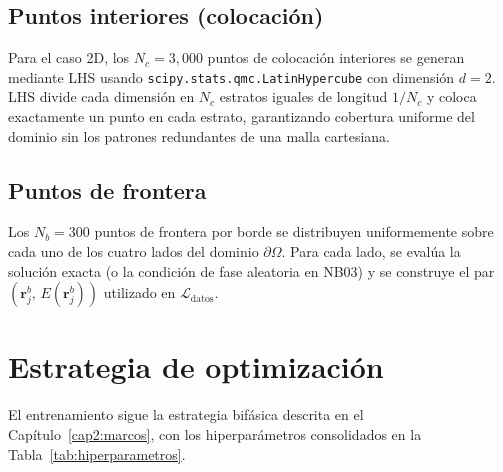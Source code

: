 \subsection{Puntos interiores (colocación)}

Para el caso 2D, los $N_c = 3{,}000$ puntos de colocación interiores se generan
mediante LHS \parencite{mckay1979lhs} usando \texttt{scipy.stats.qmc.LatinHypercube}
con dimensión $d = 2$. LHS divide cada dimensión en $N_c$ estratos iguales de
longitud $1/N_c$ y coloca exactamente un punto en cada estrato, garantizando
cobertura uniforme del dominio sin los patrones redundantes de una malla
cartesiana.

\subsection{Puntos de frontera}

Los $N_b = 300$ puntos de frontera por borde se distribuyen uniformemente sobre
cada uno de los cuatro lados del dominio $\partial\Omega$. Para cada lado, se
evalúa la solución exacta (o la condición de fase aleatoria en NB03) y se
construye el par $(\mathbf{r}^b_j,\, E(\mathbf{r}^b_j))$ utilizado en
$\mathcal{L}_\text{datos}$.

\section{Estrategia de optimización}

El entrenamiento sigue la estrategia bifásica descrita en el
Capítulo~\ref{cap2:marcos}, con los hiperparámetros consolidados en la
Tabla~\ref{tab:hiperparametros}.

